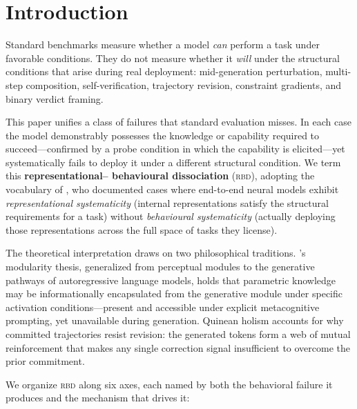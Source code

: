 \documentclass[11pt]{article}
\newcommand{\rbd}{\textsc{rbd}}
\begin{document}
\section{Introduction}
\label{sec:intro}

Standard benchmarks measure whether a model \textit{can} perform a task
under favorable conditions. They do not measure whether it
\textit{will} under the structural conditions that arise during real
deployment: mid-generation perturbation, multi-step composition,
self-verification, trajectory revision, constraint gradients, and
binary verdict framing.

This paper unifies a class of failures that standard evaluation misses.
In each case the model demonstrably possesses the knowledge or capability
required to succeed---confirmed by a probe condition in which the
capability is elicited---yet systematically fails to deploy it under a
different structural condition. We term this \textbf{representational--%
behavioural dissociation} (\rbd{}), adopting the vocabulary of
\citet{vegner2025systematicity}, who documented cases where end-to-end
neural models exhibit \textit{representational systematicity} (internal
representations satisfy the structural requirements for a task) without
\textit{behavioural systematicity} (actually deploying those
representations across the full space of tasks they license).

The theoretical interpretation draws on two philosophical traditions.
\citet{fodor1983modularity}'s modularity thesis, generalized from
perceptual modules to the generative pathways of autoregressive language
models, holds that parametric knowledge may be informationally encapsulated
from the generative module under specific activation conditions---present
and accessible under explicit metacognitive prompting, yet unavailable
during generation. Quinean holism \citep{quine1951two} accounts for why
committed trajectories resist revision: the generated tokens form a web
of mutual reinforcement that makes any single correction signal
insufficient to overcome the prior commitment.

We organize \rbd{} along six axes, each named by both the behavioral
failure it produces and the mechanism that drives it:
\end{document}
